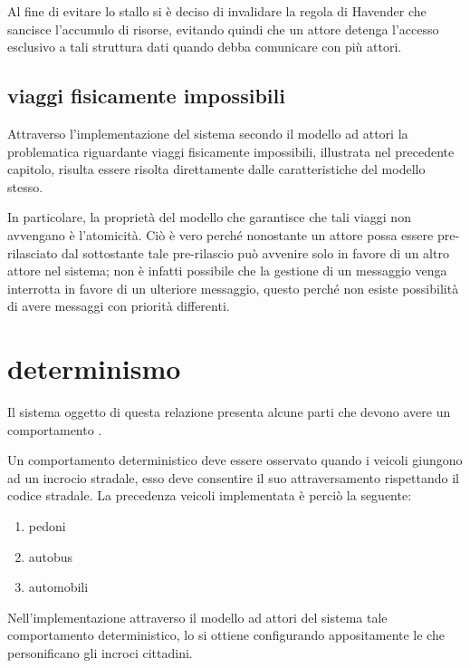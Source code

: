 Al fine di evitare lo stallo si è deciso di invalidare la regola di Havender che sancisce l'accumulo di risorse, evitando quindi che un attore detenga l'accesso esclusivo a tali struttura dati quando debba comunicare con più attori.

\subsection*{viaggi fisicamente impossibili}
\label{analisi-della-soluzione-concorrenza-viaggi-fisicamente-impossibili}
Attraverso l'implementazione del sistema secondo il modello ad attori la problematica riguardante viaggi fisicamente impossibili, illustrata nel precedente capitolo, risulta essere risolta direttamente dalle caratteristiche del modello stesso.

In particolare, la proprietà del modello che garantisce che tali viaggi non avvengano è l'atomicità. Ciò è vero perché nonostante un attore possa essere pre-rilasciato dal  sottostante tale pre-rilascio può avvenire solo in favore di un altro attore nel sistema; non è infatti possibile che la gestione di un messaggio venga interrotta in favore di un ulteriore messaggio, questo perché non esiste possibilità di avere messaggi con priorità differenti.

\section*{determinismo}
\label{analisi-della-soluzione-determinismo}
Il sistema oggetto di questa relazione presenta alcune parti che devono avere un comportamento .

Un comportamento deterministico deve essere osservato quando i veicoli giungono ad un incrocio stradale, esso deve consentire il suo attraversamento rispettando il codice stradale. La precedenza veicoli implementata è perciò la seguente:

\begin{enumerate}
\item{pedoni}
\item{autobus}
\item{automobili}
\end{enumerate}

Nell'implementazione attraverso il modello ad attori del sistema tale comportamento deterministico, lo si ottiene configurando appositamente le  che personificano gli incroci cittadini.

